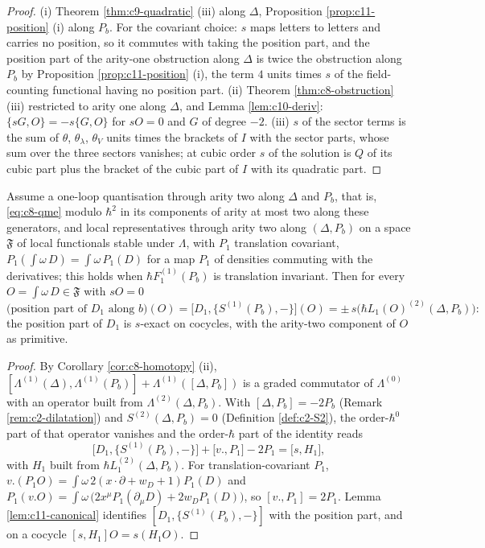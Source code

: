 \begin{proof}
(i) Theorem \ref{thm:c9-quadratic} (iii) along $\Delta$, Proposition \ref{prop:c11-position} (i) along $P_b$. For the covariant choice: $s$ maps letters to letters and carries no position, so it commutes with taking the position part, and the position part of the arity-one obstruction along $\Delta$ is twice the obstruction along $P_b$ by Proposition \ref{prop:c11-position} (i), the term $4$ units times $s$ of the field-counting functional having no position part. (ii) Theorem \ref{thm:c8-obstruction} (iii) restricted to arity one along $\Delta$, and Lemma \ref{lem:c10-deriv}: $\{sG,O\}=-s\{G,O\}$ for $sO=0$ and $G$ of degree $-2$. (iii) $s$ of the sector terms is the sum of $\theta$, $\theta_\lambda$, $\theta_V$ units times the brackets of $I$ with the sector parts, whose sum over the three sectors vanishes; at cubic order $s$ of the solution is $Q$ of its cubic part plus the bracket of the cubic part of $I$ with its quadratic part.
\end{proof}

\begin{theorem}
\label{thm:c11-arity2}
Assume a one-loop quantisation through arity two along $\Delta$ and $P_b$, that is, \eqref{eq:c8-qme} modulo $\hbar^2$ in its components of arity at most two along these generators, and local representatives through arity two along $(\Delta,P_b)$ on a space $\mathfrak F$ of local functionals stable under $\Lambda$, with $P_1$ translation covariant, $P_1(\int\omega\,D)=\int\omega\,P_1(D)$ for a map $P_1$ of densities commuting with the derivatives; this holds when $\hbar F_1^{(1)}(P_b)$ is translation invariant. Then for every $O=\int\omega\,D\in\mathfrak F$ with $sO=0$
\[
\big(\text{position part of }D_1\text{ along }b\big)(O)=\big[D_1,\{S^{(1)}(P_b),-\}\big](O)=\pm\,s\Big(\hbar L_1(O)^{(2)}(\Delta,P_b)\Big):
\]
the position part of $D_1$ is $s$-exact on cocycles, with the arity-two component of $O$ as primitive.
\end{theorem}

\begin{proof}
By Corollary \ref{cor:c8-homotopy} (ii), $[\Lambda^{(1)}(\Delta),\Lambda^{(1)}(P_b)]+\Lambda^{(1)}([\Delta,P_b])$ is a graded commutator of $\Lambda^{(0)}$ with an operator built from $\Lambda^{(2)}(\Delta,P_b)$. With $[\Delta,P_b]=-2P_b$ (Remark \ref{rem:c2-dilatation}) and $S^{(2)}(\Delta,P_b)=0$ (Definition \ref{def:c2-S2}), the order-$\hbar^0$ part of that operator vanishes and the order-$\hbar$ part of the identity reads
\[
\big[D_1,\{S^{(1)}(P_b),-\}\big]+\big[v.,P_1\big]-2P_1=\big[s,H_1\big],
\]
with $H_1$ built from $\hbar L_1^{(2)}(\Delta,P_b)$. For translation-covariant $P_1$, $v.(P_1O)=\int\omega\,2(x\cdot\partial+w_D+1)P_1(D)$ and $P_1(v.O)=\int\omega\,\big(2x^\mu P_1(\partial_\mu D)+2w_DP_1(D)\big)$, so $[v.,P_1]=2P_1$. Lemma \ref{lem:c11-canonical} identifies $[D_1,\{S^{(1)}(P_b),-\}]$ with the position part, and on a cocycle $[s,H_1]O=s(H_1O)$.
\end{proof}

